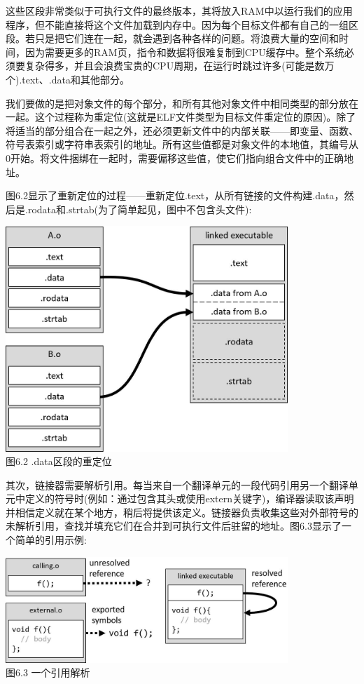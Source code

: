 这些区段非常类似于可执行文件的最终版本，其将放入RAM中以运行我们的应用程序，但不能直接将这个文件加载到内存中。因为每个目标文件都有自己的一组区段。若只是把它们连在一起，就会遇到各种各样的问题。将浪费大量的空间和时间，因为需要更多的RAM页，指令和数据将很难复制到CPU缓存中。整个系统必须要复杂得多，并且会浪费宝贵的CPU周期，在运行时跳过许多(可能是数万个).text、.data和其他部分。

我们要做的是把对象文件的每个部分，和所有其他对象文件中相同类型的部分放在一起。这个过程称为重定位(这就是ELF文件类型为目标文件重定位的原因)。除了将适当的部分组合在一起之外，还必须更新文件中的内部关联——即变量、函数、符号表索引或字符串表索引的地址。所有这些值都是对象文件的本地值，其编号从0开始。将文件捆绑在一起时，需要偏移这些值，使它们指向组合文件中的正确地址。

图6.2显示了重新定位的过程——重新定位.text，从所有链接的文件构建.data，然后是.rodata和.strtab(为了简单起见，图中不包含头文件):

\begin{center}
\includegraphics[width=0.8\textwidth]{content/2/chapter6/images/2.jpg}\\
图6.2 .data区段的重定位
\end{center}

其次，链接器需要解析引用。每当来自一个翻译单元的一段代码引用另一个翻译单元中定义的符号时(例如：通过包含其头或使用extern关键字)，编译器读取该声明并相信定义就在某个地方，稍后将提供该定义。链接器负责收集这些对外部符号的未解析引用，查找并填充它们在合并到可执行文件后驻留的地址。图6.3显示了一个简单的引用示例:

\begin{center}
\includegraphics[width=0.8\textwidth]{content/2/chapter6/images/3.jpg}\\
图6.3 一个引用解析
\end{center}


